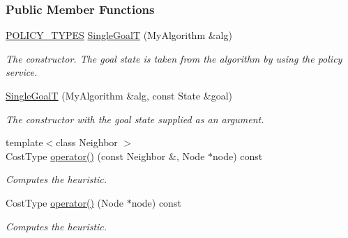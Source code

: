 \subsubsection*{Public Member Functions}
\begin{DoxyCompactItemize}
\item 
\hyperlink{extensions_2shared__policies_2headers_8h_ae70a06fa4631780beea14971eb36a562}{P\+O\+L\+I\+C\+Y\+\_\+\+T\+Y\+P\+ES} \hyperlink{structslb_1_1ext_1_1policy_1_1heuristic_1_1SingleGoalT_a5bd9a7d38cec87c422abe9f7e08d3fe6}{Single\+GoalT} (My\+Algorithm \&alg)
\begin{DoxyCompactList}\small\item\em The constructor. The goal state is taken from the algorithm by using the policy service. \end{DoxyCompactList}\item 
\hyperlink{structslb_1_1ext_1_1policy_1_1heuristic_1_1SingleGoalT_a109419aa94dffc9359b338acb06bba8d}{Single\+GoalT} (My\+Algorithm \&alg, const State \&goal)
\begin{DoxyCompactList}\small\item\em The constructor with the goal state supplied as an argument. \end{DoxyCompactList}\item 
{\footnotesize template$<$class Neighbor $>$ }\\Cost\+Type \hyperlink{structslb_1_1ext_1_1policy_1_1heuristic_1_1SingleGoalT_a9a5a37acd02a84a619ac27ce1142b8c2}{operator()} (const Neighbor \&, Node $\ast$node) const 
\begin{DoxyCompactList}\small\item\em Computes the heuristic. \end{DoxyCompactList}\item 
Cost\+Type \hyperlink{structslb_1_1ext_1_1policy_1_1heuristic_1_1SingleGoalT_aa77977fc0c95f3fc79a9c35c9f2c5179}{operator()} (Node $\ast$node) const 
\begin{DoxyCompactList}\small\item\em Computes the heuristic. \end{DoxyCompactList}\end{DoxyCompactItemize}
